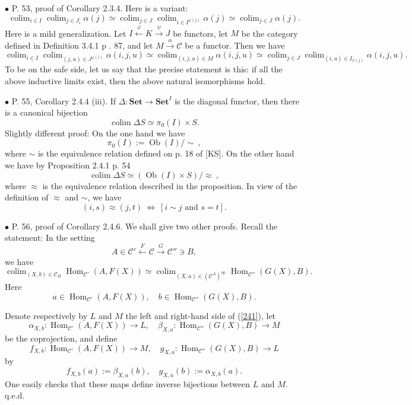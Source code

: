 \documentclass[12pt]{article}
\theoremstyle{remark}
\newcommand{\bu}{\bullet}
\newcommand{\n}{\noindent}
\newcommand{\C}{\mathcal C}
\newcommand{\Set}{\textbf{Set}}
\newcommand{\op}{\text{op}}
\newcommand{\p}{\varphi}
\DeclareMathOperator*{\coli}{colim}
\DeclareMathOperator{\Hom}{Hom}
\DeclareMathOperator{\Ob}{Ob}
\begin{document}

\n$\bu$ P. 53, proof of Corollary 2.3.4. Here is a variant: 
$$
\coli_{i\in I}\coli_{j\in J_i}\alpha(j)\simeq
\coli_{j\in J}\coli_{i\in I^{\p(j)}}\alpha(j)\simeq
\coli_{j\in J}\alpha(j). 
$$ 
Here is a mild generalization. Let $I\xleftarrow{\p}K\xrightarrow{\psi}J$ be functors, let $M$ be the category defined in Definition 3.4.1 p . 87, and let $M\xrightarrow{\alpha}\C$ be a functor. Then we have 
$$ 
\coli_{i\in I}\coli_{(j,u)\in J^{\p(i)}}\alpha(i,j,u)\simeq
\coli_{(i,j,u)\in M}\alpha(i,j,u)\simeq
\coli_{j\in J}\coli_{(i,u)\in I_{\psi(j)}}\alpha(i,j,u). 
$$ 
To be on the safe side, let us say that the precise statement is this: if all the above inductive limits exist, then the above natural isomorphisms hold. 


\n$\bu$ P. 55, Corollary 2.4.4 (iii). If $\Delta:\Set\to\Set^I$ is the diagonal functor, then there is a canonical bijection
$$
\coli\Delta S\simeq\pi_0(I)\times S.
$$
Slightly different proof: On the one hand we have 
$$
\pi_0(I):=\Ob(I)/\!\!\sim\ , 
$$
where $\sim$ is the equivalence relation defined on p. 18 of [KS]. On the other hand  we have by Proposition 2.4.1 p. 54
$$
\coli\Delta S\simeq(\Ob(I)\times S)/\!\!\approx\ ,
$$
where $\approx$ is the equivalence relation described in the proposition. In view of the definition of $\approx$ and $\sim$, we have 
$$
(i,s)\approx(j,t)\ \iff\ [i\sim j\text{ and }s=t].
$$  


\n$\bu$ P. 56, proof of Corollary 2.4.6. We shall give two other proofs. Recall the statement: In the setting 
% 
\begin{equation}\label{241s}
A\in\C'\xleftarrow{F}\C\xrightarrow{G}\C''\ni B, 
\end{equation} 
% 
we have 
% 
\begin{equation}\label{241} 
\coli_{(X,b)\in\C_B}\Hom_{\C'}(A,F(X))\simeq 
\coli_{(X,a)\in(\C^A)^\op}\Hom_{\C''}(G(X),B). 
\end{equation} 
% 
Here  
$$
a\in\Hom_{\C'}(A,F(X)),\quad b\in\Hom_{\C''}(G(X),B). 
$$ 

\n{\em First proof.} Denote respectively by $L$ and $M$ the left and right-hand side of (\ref{241}), let 
$$
\alpha_{X,b}:\Hom_{\C'}(A,F(X))\to L,\quad\beta_{X,a}:\Hom_{\C''}(G(X),B)\to M
$$
be the coprojection, and define 
$$
f_{X,b}:\Hom_{\C'}(A,F(X))\to M,\quad g_{X,a}:\Hom_{\C''}(G(X),B)\to L
$$
by
$$
f_{X,b}(a):=\beta_{X,a}(b),\quad g_{X,a}(b):=\alpha_{X,b}(a).
$$
One easily checks that these maps define inverse bijections between $L$ and $M$. q.e.d. 
\end{document}
